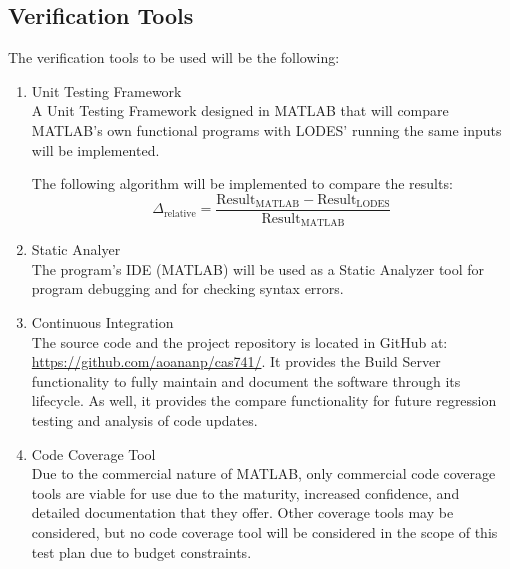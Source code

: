 \documentclass[12pt, titlepage]{article}
\newcommand{\famname}{LODES} %
\newcommand{\famurl}{https://github.com/aoananp/cas741/}
\begin{document}
\subsection{Verification Tools} \label{sec_verificationtools}
The verification tools to be used will be the following:

\begin{enumerate}
\item{Unit Testing Framework\\}
A Unit Testing Framework designed in MATLAB that will compare MATLAB's own functional programs
with
\famname{}' running the same inputs will be implemented.

The following algorithm will be implemented to compare the results:
$$\Delta_{\text{relative}} = \frac{\text{Result}_\text{MATLAB} - \text{Result}_\text{\famname{}}} {\text{Result}_\text{MATLAB}} $$

\item{Static Analyer\\}
The program's IDE (MATLAB) will be used as a Static Analyzer tool for program debugging and
for checking syntax errors.

\item{Continuous Integration\\}
The source code and the project repository is located in GitHub at: \url{\famurl}.
It provides the Build Server functionality to fully maintain and document the software through its lifecycle.
As well, it provides the compare functionality for future regression testing and analysis of code updates.

\item{Code Coverage Tool\\}
Due to the commercial nature of MATLAB, only commercial code coverage tools are viable for use due to the maturity, increased confidence, and detailed documentation that they offer. Other coverage tools may be considered, but no code coverage tool will be considered in the scope of this test plan due to budget constraints.

\end{enumerate}


		
\end{document}
